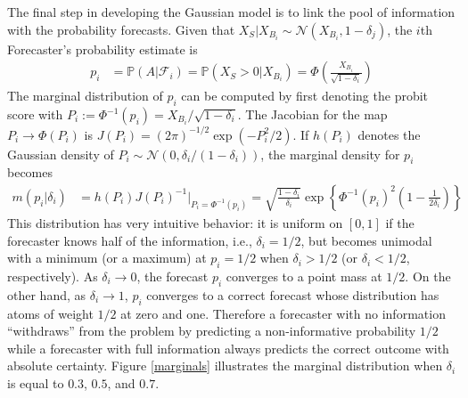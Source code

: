 \documentclass[12pt]{article}
\renewcommand{\P}{\mathbb{P}}
\theoremstyle{definition}
\theoremstyle{definition}
\def\one{\mathbbm{1}}
\def\P{{\mathbb P}}
\begin{document}
The final step in developing the Gaussian model is
to link the pool of information with the probability forecasts. Given that $X_S | X_{B_i} \sim \mathcal{N}\left(X_{B_i}, 1-\delta_j\right)$, the $i$th Forecaster's probability estimate is
\begin{align}
p_i &= \P\left(A | \mathcal{F}_{i}\right) = \P\left(X_S > 0 | X_{B_i}\right) = \Phi\left( \frac{X_{B_i}}{\sqrt{1-\delta_i}}\right) \label{indFore}
\end{align}
The marginal distribution of $p_i$ can be computed by first denoting the probit score with $P_{i} := \Phi^{-1}(p_i) = X_{B_i}/\sqrt{1-\delta_i}$. The Jacobian for the map $P_{i} \to \Phi(P_i)$ is $J(P_i) = (2\pi)^{-1/2} \exp \left( - P_i^2/2   \right)$. If $h(P_i)$ denotes the Gaussian density of $P_i \sim \mathcal{N}\left(0, \delta_i / (1-\delta_i)\right)$, 
the marginal density for $p_i$ becomes
\begin{align*}
 m\left(p_i | \delta_i \right) &= h(P_i) J(P_i)^{-1} \bigg|_{P_i = \Phi^{-1}(p_i)} = \sqrt{\frac{1-\delta_i}{\delta_i}} \exp 
   \left\{ \Phi^{-1}(p_i)^2 \left(1-\frac{1}{2 \delta_i} \right) \right\} 
\end{align*}
This distribution has very intuitive behavior: it is uniform on $[0,1]$ if the forecaster knows half of the
information, i.e.,  $\delta_i = 1/2$, but becomes 
unimodal with a minimum (or a maximum) at $p_i = 1/2$ when $\delta_i > 1/2$ (or $\delta_i < 1/2$, respectively).  As $\delta_i \to 0$, the forecast $p_i$ converges to a point mass at $1/2$. On the other hand, as $\delta_i \to 1$, $p_i$ converges to
a correct forecast whose distribution has atoms of weight $1/2$ at
zero and one. Therefore a forecaster with no information ``withdraws'' from the problem by predicting a non-informative probability $1/2$ while a forecaster with full information always predicts the correct outcome with absolute certainty. Figure \ref{marginals} illustrates the marginal
distribution when $\delta_i$ is equal to $0.3$, $0.5$, and $0.7$.
\end{document}
